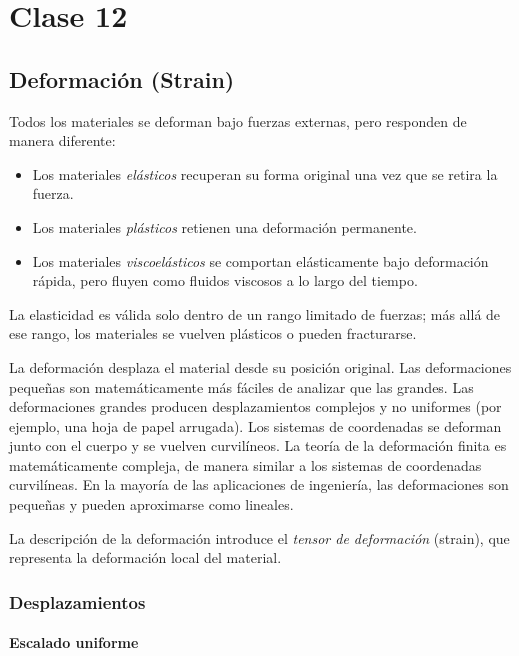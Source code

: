 \chapter{Clase 12}

\section{Deformación (Strain)}

Todos los materiales se deforman bajo fuerzas externas, pero responden de manera diferente:
\begin{itemize}
\item Los materiales \emph{elásticos} recuperan su forma original una vez que se retira la fuerza.
\item Los materiales \emph{plásticos} retienen una deformación permanente.
\item Los materiales \emph{viscoelásticos} se comportan elásticamente bajo deformación rápida, pero fluyen como fluidos viscosos a lo largo del tiempo.
\end{itemize}

La elasticidad es válida solo dentro de un rango limitado de fuerzas; más allá de ese rango, los materiales se vuelven plásticos o pueden fracturarse.

La deformación desplaza el material desde su posición original. Las deformaciones pequeñas son matemáticamente más fáciles de analizar que las grandes. Las deformaciones grandes producen desplazamientos complejos y no uniformes (por ejemplo, una hoja de papel arrugada). Los sistemas de coordenadas se deforman junto con el cuerpo y se vuelven curvilíneos. La teoría de la deformación finita es matemáticamente compleja, de manera similar a los sistemas de coordenadas curvilíneas. En la mayoría de las aplicaciones de ingeniería, las deformaciones son pequeñas y pueden aproximarse como lineales.

La descripción de la deformación introduce el \emph{tensor de deformación} (strain), que representa la deformación local del material.

\subsection{Desplazamientos}

\subsubsection{Escalado uniforme}

